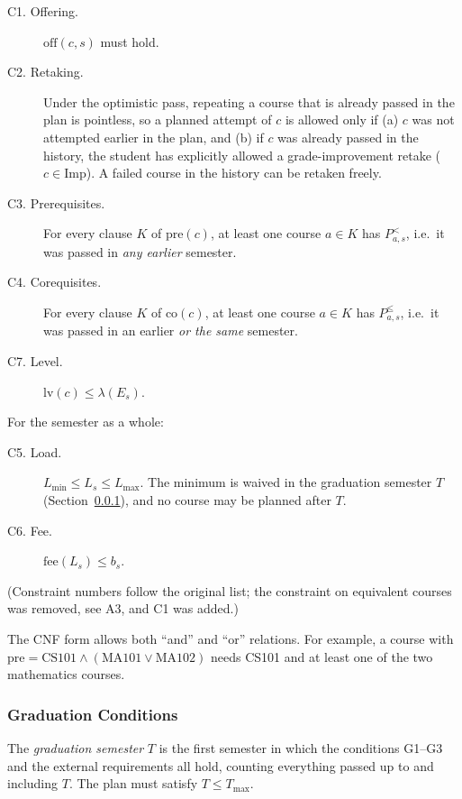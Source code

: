 \begin{description}
  \item[C1. Offering.] $\mathrm{off}(c,s)$ must hold.
  \item[C2. Retaking.] Under the optimistic pass, repeating a course that
        is already passed in the plan is pointless, so a planned attempt of
        $c$ is allowed only if
        (a) $c$ was not attempted earlier in the plan, and
        (b) if $c$ was already passed in the history, the student has
        explicitly allowed a grade-improvement retake ($c\in\mathrm{Imp}$).
        A failed course in the history can be retaken freely.
  \item[C3. Prerequisites.] For every clause $K$ of $\mathrm{pre}(c)$, at least
        one course $a\in K$ has $P^{<}_{a,s}$, i.e.\ it was passed in
        \emph{any earlier} semester.
  \item[C4. Corequisites.] For every clause $K$ of $\mathrm{co}(c)$, at least
        one course $a\in K$ has $P^{\le}_{a,s}$, i.e.\ it was passed in an
        earlier \emph{or the same} semester.
  \item[C7. Level.] $\mathrm{lv}(c) \le \lambda(E_s)$.
\end{description}
For the semester as a whole:
\begin{description}
  \item[C5. Load.] $L_{\min}\le L_s\le L_{\max}$. The minimum is waived in
        the graduation semester $T$ (Section~\ref{sec:graduation}), and no
        course may be planned after $T$.
  \item[C6. Fee.] $\mathrm{fee}(L_s)\le b_s$.
\end{description}
(Constraint numbers follow the original list; the constraint on equivalent
courses was removed, see A3, and C1 was added.)

The CNF form allows both ``and'' and ``or'' relations. For example, a course
with $\mathrm{pre}=\text{CS101}\wedge(\text{MA101}\vee\text{MA102})$ needs
CS101 and at least one of the two mathematics courses.

\subsubsection{Graduation Conditions}
\label{sec:graduation}

The \emph{graduation semester} $T$ is the first semester in which the
conditions G1--G3 and the external requirements all hold, counting everything
passed up to and including $T$. The plan must satisfy $T\le T_{\max}$.

